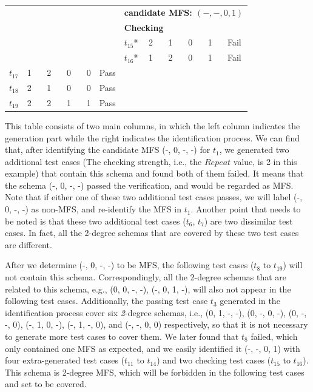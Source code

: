 \documentclass[journal,12pt,onecolumn,draftclsnofoot,]{IEEEtran}
\begin{document}
\begin{table}[ht]
\begin{tabular}{llllll|llllll}
\multicolumn{5}{l}{}& &\multicolumn{6}{l}{ \bfseries{candidate MFS}: $(-, -, 0, 1)$ }  \\
\multicolumn{5}{l}{}& &\multicolumn{6}{l}{ \bfseries{\textbf{Checking}} }  \\
\multicolumn{5}{l}{}& & $t_{15}$* &\multicolumn{4}{l}{2  \ \ \  1 \ \ \  0 \ \ \  1 }& Fail \\
\multicolumn{5}{l}{}& & $t_{16}$* &\multicolumn{4}{l}{1  \ \ \  2 \ \ \  0 \ \ \  1 }& Fail \\
$t_{17}$ &\multicolumn{4}{l}{1  \ \ \  2 \ \ \ 0 \ \ \ 0 } & Pass & \multicolumn{6}{l}{}\\
$t_{18}$ &\multicolumn{4}{l}{2  \ \ \   1 \ \ \ 0  \ \ \  0 } & Pass & \multicolumn{6}{l}{}\\
$t_{19}$ &\multicolumn{4}{l}{2  \ \ \   2 \ \ \ 1  \ \ \  1 } & Pass & \multicolumn{6}{l}{}\\
\hline
\end{tabular}
\end{table}

This table consists of two main columns, in which the left column indicates the generation part while the right indicates the identification process. We can find that, after identifying the candidate MFS (-, 0, -, -) for $t_{1}$, we generated two additional test cases (The checking strength, i.e., the $Repeat$ value, is 2 in this example) that contain this schema and found both of them failed. It means that the schema (-, 0, -, -) passed the verification, and would be regarded as MFS. Note that if either one of these two additional test cases passes, we will label (-, 0, -, -) as non-MFS, and re-identify the MFS in $t_{1}$.  Another point that needs to be noted is that these two additional test cases ($t_{6}$, $t_{7}$) are two dissimilar test cases. In fact, all the 2-degree schemas that are covered by these two test cases are different.


After we determine (-, 0, -, -) to be MFS, the following test cases ($t_{8}$ to $t_{19}$) will not contain this schema. Correspondingly, all the 2-degree schemas that are related to this schema, e.g., (0, 0, -, -), (-, 0, 1, -),  will also not appear in the following test cases. Additionally, the passing test case $t_{3}$ generated in the identification process cover six \emph{2}-degree schemas, i.e., (0, 1, -, -), (0, -, 0, -), (0, -, -, 0), (-, 1, 0, -), (-, 1, -, 0), and (-, -, 0, 0) respectively, so that it is not necessary to generate more test cases to cover them. We later found that $t_{8}$ failed, which only contained one MFS as expected, and we easily identified it (-, -, 0, 1) with four extra-generated test cases ($t_{11}$ to $t_{14}$) and two checking test cases ($t_{15}$ to $t_{16}$). This schema is 2-degree MFS, which will be forbidden in the following test cases and set to be covered.
\end{document}
